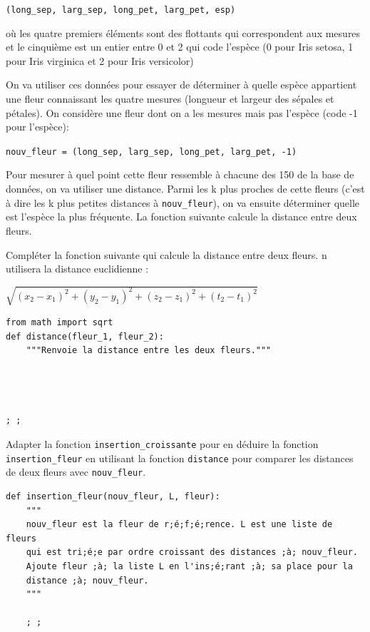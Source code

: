 \verb+(long_sep, larg_sep, long_pet, larg_pet, esp)+

où les quatre premiers éléments sont des flottants qui correspondent aux mesures et le cinquième est un entier entre 0 et 2 qui code l'espèce (0 pour Iris setosa, 1 pour Iris virginica et 2 pour Iris versicolor)

On va utiliser ces données pour essayer de déterminer à quelle espèce appartient une fleur connaissant les quatre mesures (longueur et largeur des sépales et pétales). On considère une fleur dont on a les mesures mais pas l'espèce (code -1 pour l'espèce):

\verb+nouv_fleur = (long_sep, larg_sep, long_pet, larg_pet, -1)+
\bigskip

\medskip

Pour mesurer à quel point cette fleur ressemble à chacune des 150 de la base de données, on va utiliser une distance. Parmi les k plus proches de cette fleurs (c'est à dire les k plus petites distances à \verb+nouv_fleur+), on va ensuite déterminer quelle est l'espèce la plus fréquente. La fonction suivante calcule la distance entre deux fleurs. 

Compléter la fonction suivante qui calcule la distance entre deux fleurs. n utilisera la distance euclidienne : \begin{center}
$\sqrt{(x_{2}-x_{1})^{2}+(y_{2}-y_{1})^{2}+(z_{2}-z_{1})^{2}+(t_{2}-t_{1})^{2}}$
\end{center}

\begin{lstlisting}[escapeinside =;;]
from math import sqrt
def distance(fleur_1, fleur_2):
    """Renvoie la distance entre les deux fleurs."""
    
    
    
    
; ;
\end{lstlisting}



\medskip

Adapter la fonction \verb+insertion_croissante+  pour en déduire la fonction \verb+insertion_fleur+ en utilisant la fonction \verb+distance+ pour comparer les distances de deux fleurs avec \verb+nouv_fleur+. 

\begin{lstlisting}[escapeinside =;;]
def insertion_fleur(nouv_fleur, L, fleur):
    """
    nouv_fleur est la fleur de r;é;f;é;rence. L est une liste de fleurs 
    qui est tri;é;e par ordre croissant des distances ;à; nouv_fleur.
    Ajoute fleur ;à; la liste L en l'ins;é;rant ;à; sa place pour la 
    distance ;à; nouv_fleur.
    """
    
    ; ; 
    \end{lstlisting}
    
